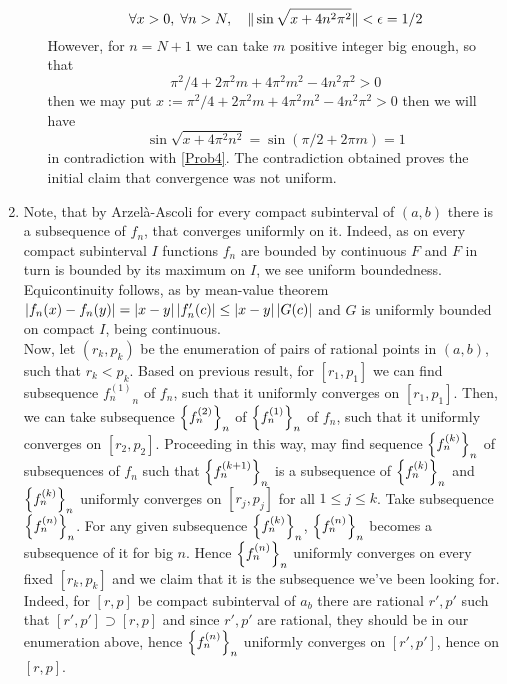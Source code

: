 \documentclass[10pt]{article} %
\begin{document}
\begin{enumerate}[(1)]
\begin{enumerate}[(a)]
\begin{equation}
			\forall x>0,\;\forall n>N,\quad \|\sin\sqrt{x+4n^2\pi^2}\|<\epsilon=1/2\label{Prob4}\end{equation}
			However, for $n=N+1$ we can take $m$ positive integer big enough, so that
			\[\pi^2/4+2\pi^2m+4\pi^2m^2-4n^2\pi^2>0\]
			then we may put $x:=\pi^2/4+2\pi^2m+4\pi^2m^2-4n^2\pi^2>0$
			then we will have
			\[\sin\sqrt{x+4\pi^2n^2}=\sin(\pi/2+2\pi m)=1\]
			in contradiction with \ref{Prob4}. The contradiction obtained proves the initial claim that convergence
			was not uniform.
	\end{enumerate}
\item Note, that by Arzel\`a-Ascoli for every compact subinterval of $(a,b)$ there is a subsequence of $f_n$, that converges
	uniformly on it. Indeed, as on every compact subinterval $I$ functions $f_n$ are bounded by continuous $F$ and $F$ in turn is
	bounded by its maximum on $I$, we see uniform boundedness. Equicontinuity follows, as by mean-value theorem
	$\left|f_n(x)-f_n(y)\right|=\left|x-y\right|\left|f_n'(c)\right|\leq\left|x-y\right|\left|G(c)\right|$ and $G$ is uniformly bounded on compact $I$, being continuous.\\

	Now, let $(r_k,p_k)$ be the enumeration of pairs of rational points in $(a,b)$, such that $r_k<p_k$. Based on previous
	result, for $[r_1,p_1]$ we can find subsequence ${f^{(1)}_n}_n$ of $f_n$, such that it uniformly converges on $[r_1,p_1]$. Then,
	we can take subsequence $\left\{
	f^{(2)}_n\right\}_n$ of $\left\{f^{(1)}_n\right\}_n$ of $f_n$, such that it uniformly converges on $[r_2,p_2]$.
	Proceeding in this way, may find sequence $\left\{f^{(k)}_n\right\}_n$ of subsequences of $f_n$ such that $\left\{f^{(k+1)}_n\right\}_n$ 
	is a subsequence of $\left\{f^{(k)}_n\right\}_n$ and $\left\{f^{(k)}_n\right\}_n$ uniformly converges on 
	$[r_j,p_j]$ for all $1\leq j\leq k$. Take subsequence $\left\{f^{(n)}_n\right\}_n$. For any given subsequence 
	$\left\{f^{(k)}_n\right\}_n$, $\left\{f^{(n)}_n\right\}_n$ becomes a subsequence of it for big $n$. Hence
	$\left\{f^{(n)}_n\right\}_n$ uniformly converges on every fixed $[r_k,p_k]$ and we claim that it is the subsequence we've been looking for.\\

	Indeed, for $[r,p]$ be compact subinterval of $a_b$ there are rational $r', p'$ such that $[r',p']\supset[r,p]$ and
	since $r',p'$ are rational, they should be in our enumeration above, hence 
	$\left\{f^{(n)}_n\right\}_n$ uniformly converges on $[r',p']$, hence on $[r,p]$.
\end{enumerate}
\end{document}
